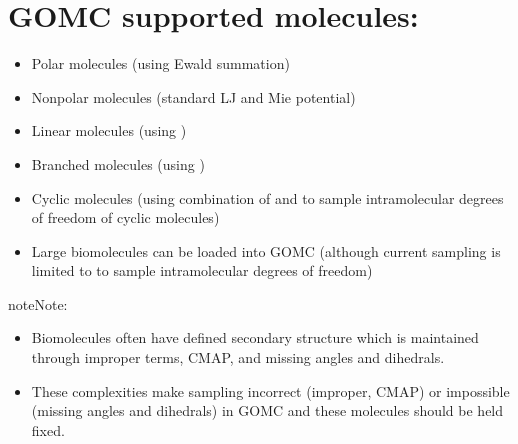 \documentclass[letterpaper,10pt,english]{sphinxmanual}
\begin{document}
\section{GOMC supported molecules:}
\label{\detokenize{introduction:gomc-supported-molecules}}\begin{itemize}
\item {} 
\sphinxAtStartPar
Polar molecules (using Ewald summation)

\item {} 
\sphinxAtStartPar
Non\sphinxhyphen{}polar molecules (standard LJ and Mie potential)

\item {} 
\sphinxAtStartPar
Linear molecules (using )

\item {} 
\sphinxAtStartPar
Branched molecules (using )

\item {} 
\sphinxAtStartPar
Cyclic molecules (using combination of  and  to sample intramolecular degrees of freedom of cyclic molecules)

\item {} 
\sphinxAtStartPar
Large biomolecules can be loaded into GOMC (although current sampling is limited to  to sample intramolecular degrees of freedom)

\end{itemize}

\begin{sphinxadmonition}{note}{Note:}\begin{itemize}
\item {} 
\sphinxAtStartPar
Biomolecules often have defined secondary structure which is maintained through improper terms, CMAP, and missing angles and dihedrals.

\item {} 
\sphinxAtStartPar
These complexities make sampling incorrect (improper, CMAP) or impossible (missing angles and dihedrals) in GOMC and these molecules should be held fixed.

\end{itemize}
\end{sphinxadmonition}
\end{document}
